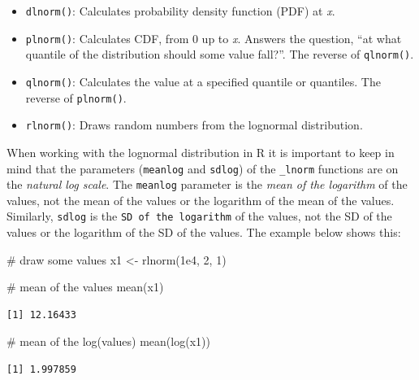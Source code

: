 \documentclass[
  13,
  letterpaper,
]{report}
\newenvironment{Shaded}{\begin{snugshade}}{\end{snugshade}}
\newcommand{\CommentTok}[1]{\textcolor[rgb]{0.37,0.37,0.37}{#1}}
\newcommand{\DecValTok}[1]{\textcolor[rgb]{0.68,0.00,0.00}{#1}}
\newcommand{\FloatTok}[1]{\textcolor[rgb]{0.68,0.00,0.00}{#1}}
\newcommand{\FunctionTok}[1]{\textcolor[rgb]{0.28,0.35,0.67}{#1}}
\newcommand{\NormalTok}[1]{\textcolor[rgb]{0.00,0.23,0.31}{#1}}
\newcommand{\OtherTok}[1]{\textcolor[rgb]{0.00,0.23,0.31}{#1}}
\providecommand{\tightlist}{%
  \setlength{\itemsep}{0pt}\setlength{\parskip}{0pt}}
\begin{document}
\begin{itemize}
\tightlist
\item
  \texttt{dlnorm()}: Calculates probability density function (PDF) at
  \emph{x}.
\item
  \texttt{plnorm()}: Calculates CDF, from 0 up to \emph{x}. Answers the
  question, ``at what quantile of the distribution should some value
  fall?''. The reverse of \texttt{qlnorm()}.
\item
  \texttt{qlnorm()}: Calculates the value at a specified quantile or
  quantiles. The reverse of \texttt{plnorm()}.
\item
  \texttt{rlnorm()}: Draws random numbers from the lognormal
  distribution.
\end{itemize}

When working with the lognormal distribution in R it is important to
keep in mind that the parameters (\texttt{meanlog} and \texttt{sdlog})
of the \texttt{\_lnorm} functions are on the \emph{natural log scale}.
The \texttt{meanlog} parameter is the \emph{mean of the logarithm} of
the values, not the mean of the values or the logarithm of the mean of
the values. Similarly, \texttt{sdlog} is the
\texttt{SD\ of\ the\ logarithm} of the values, not the SD of the values
or the logarithm of the SD of the values. The example below shows this:

\begin{Shaded}
\begin{Highlighting}[]
\CommentTok{\# draw some values}
\NormalTok{x1 }\OtherTok{\textless{}{-}} \FunctionTok{rlnorm}\NormalTok{(}\FloatTok{1e4}\NormalTok{, }\DecValTok{2}\NormalTok{, }\DecValTok{1}\NormalTok{)}

\CommentTok{\# mean of the values}
\FunctionTok{mean}\NormalTok{(x1)}
\end{Highlighting}
\end{Shaded}

\begin{verbatim}
[1] 12.16433
\end{verbatim}

\begin{Shaded}
\begin{Highlighting}[]
\CommentTok{\# mean of the log(values)}
\FunctionTok{mean}\NormalTok{(}\FunctionTok{log}\NormalTok{(x1))}
\end{Highlighting}
\end{Shaded}

\begin{verbatim}
[1] 1.997859
\end{verbatim}
\end{document}
